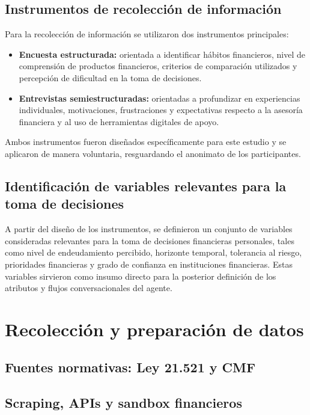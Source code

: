 \documentclass[
	spanish, %
	letterpaper, oneside
]{book}
\begin{document}
\begin{itemize}
\subsection{Instrumentos de recolección de información}

Para la recolección de información se utilizaron dos instrumentos principales:

\begin{itemize}
    \item \textbf{Encuesta estructurada:} orientada a identificar hábitos financieros, nivel de comprensión de productos financieros, criterios de comparación utilizados y percepción de dificultad en la toma de decisiones.
    \item \textbf{Entrevistas semiestructuradas:} orientadas a profundizar en experiencias individuales, motivaciones, frustraciones y expectativas respecto a la asesoría financiera y al uso de herramientas digitales de apoyo.
\end{itemize}

Ambos instrumentos fueron diseñados específicamente para este estudio y se aplicaron de manera voluntaria, resguardando el anonimato de los participantes.

\subsection{Identificación de variables relevantes para la toma de decisiones}

A partir del diseño de los instrumentos, se definieron un conjunto de variables consideradas relevantes para la toma de decisiones financieras personales, tales como nivel de endeudamiento percibido, horizonte temporal, tolerancia al riesgo, prioridades financieras y grado de confianza en instituciones financieras. Estas variables sirvieron como insumo directo para la posterior definición de los atributos y flujos conversacionales del agente.
\section{Recolección y preparación de datos}
\subsection{Fuentes normativas: Ley 21.521 y CMF}
\subsection{Scraping, APIs y sandbox financieros}

\end{itemize}
\end{document}
